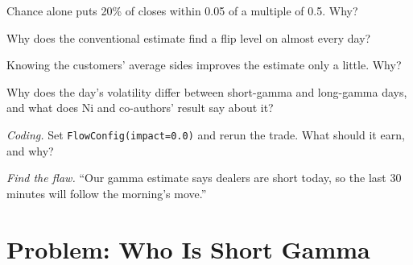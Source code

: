 \begin{exercise}[$\star$]\label{exo:s2:zero-day-options-and-dealer-gamma-flows:3}
Chance alone puts 20\% of closes within 0.05 of a multiple of 0.5. Why?
\end{exercise}

\begin{exercise}[$\star\star$]\label{exo:s2:zero-day-options-and-dealer-gamma-flows:4}
Why does the conventional estimate find a flip level on almost every day?
\end{exercise}

\begin{exercise}[$\star\star$]\label{exo:s2:zero-day-options-and-dealer-gamma-flows:5}
Knowing the customers' average sides improves the estimate only a little. Why?
\end{exercise}

\begin{exercise}[$\star\star$]\label{exo:s2:zero-day-options-and-dealer-gamma-flows:6}
Why does the day's volatility differ between short-gamma and long-gamma days, and what does Ni and co-authors' result say about it?
\end{exercise}

\begin{exercise}[$\star\star\star$]\label{exo:s2:zero-day-options-and-dealer-gamma-flows:7}
\emph{Coding.} Set \texttt{FlowConfig(impact=0.0)} and rerun the trade. What should it earn, and why?
\end{exercise}

\begin{exercise}[$\star\star\star$]\label{exo:s2:zero-day-options-and-dealer-gamma-flows:8}
\emph{Find the flaw.} ``Our gamma estimate says dealers are short today, so the last 30 minutes will follow the morning's move.''
\end{exercise}

\section{Problem: Who Is Short Gamma}

